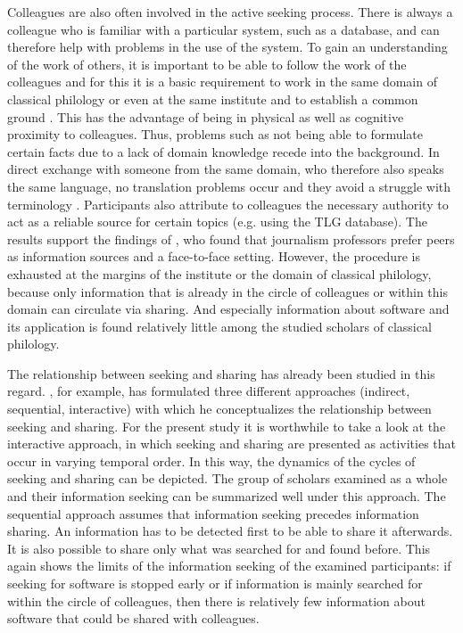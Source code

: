 \documentclass[12pt, a4paper, titlepage, oneside, abstract=true, toc=listof, toc=bibliography, BCOR=1cm]{scrreprt}
\begin{document}
{%
Colleagues are also often involved in the active seeking process. There is always a colleague who is familiar with a particular system, such as a database, and can therefore help with problems in the use of the system. To gain an understanding of the work of others, it is important to be able to follow the work of the colleagues and for this it is a basic requirement to work in the same domain of classical philology or even at the same institute and to establish a common ground \citep{Clark1991}. This has the advantage of being in physical as well as cognitive proximity to colleagues. Thus, problems such as not being able to formulate certain facts due to a lack of domain knowledge \citep[p. 616]{Savolainen2015a} recede into the background. In direct exchange with someone from the same domain, who therefore also speaks the same language, no translation problems occur and they avoid a struggle with terminology \citep[p. 104]{Palmer2002}. Participants also attribute to colleagues the necessary authority \citep{Wilson1983} to act as a reliable source for certain topics (e.g. using the TLG database). The results support the findings of \citet{Hepworth2017}, who found that journalism professors prefer peers as information sources and a face-to-face setting. However, the procedure is exhausted at the margins of the institute or the domain of classical philology, because only information that is already in the circle of colleagues or within this domain can circulate via sharing. And especially information about software and its application is found relatively little among the studied scholars of classical philology. 

The relationship between seeking and sharing has already been studied in this regard. \citet[]{Savolainen2019}, for example, has formulated three different approaches (indirect, sequential, interactive) with which he conceptualizes the relationship between seeking and sharing. For the present study it is worthwhile to take a look at the interactive approach, in which seeking and sharing are presented as activities that occur in varying temporal order. In this way, the dynamics of the cycles of seeking and sharing can be depicted. The group of scholars examined as a whole and their information seeking can be summarized well under this approach. The sequential approach assumes that information seeking precedes information sharing. An information has to be detected first to be able to share it afterwards. It is also possible to share only what was searched for and found before. This again shows the limits of the information seeking of the examined participants: if seeking for software is stopped early or if information is mainly searched for within the circle of colleagues, then there is relatively few information about software that could be shared with colleagues.

}
\end{document}
